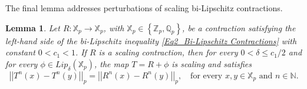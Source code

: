 \documentclass[a4paper, 12pt]{article}
\newtheorem{lemma}[theorem]{Lemma}
\theoremstyle{definition}
\begin{document}
	
	
	
	
	The final lemma addresses perturbations of scaling bi-Lipschitz contractions.
	
	\begin{lemma}\label{Lem2_Scaling Contraction plus Lipschitz}
		Let $R: \mathbb{X}_{p} \to \mathbb{X}_{p}$, with $\mathbb{X}_{p} \in  \left\{  \mathbb{Z}_{p}, \mathbb{Q}_{p}  \right\} $, be a contraction satisfying the left-hand side of the bi-Lipschitz inequality \eqref{Eq2_Bi-Lipschitz Contractions} with constant $0  < c_{1}   < 1$. 
		If $R$ is a scaling contraction, then for every $0  < \delta \le  c_{1}/2  $ and for every $\phi \in Lip_{\delta} \left(  \mathbb{X}_{p}  \right) $, the map $T = R + \phi$ is scaling and satisfies 
		\begin{equation}\label{EqLem_Scaling Maps Induction}
			\left| \left|  T^{n}(x) - T^{n}(y)  \right|  \right|_{p}   =    \left| \left|  R^{n}(x) - R^{n}(y)  \right|  \right|_{p}, \quad \text{for every } x,y \in \mathbb{X}_{p} \text{ and } n \in \mathbb{N} . 
		\end{equation} 
		
	\end{lemma}
	
	
	
\end{document}
